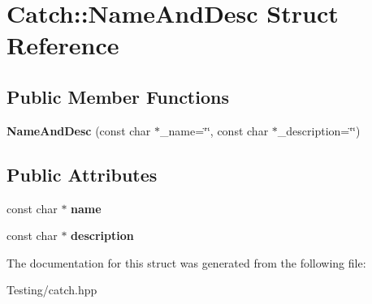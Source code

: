 \hypertarget{struct_catch_1_1_name_and_desc}{\section{Catch\-:\-:Name\-And\-Desc Struct Reference}
\label{struct_catch_1_1_name_and_desc}
}
\subsection*{Public Member Functions}
\begin{DoxyCompactItemize}
\item 
\hypertarget{struct_catch_1_1_name_and_desc_a189ceb9942fb5f6635140d6a09fc843a}{{\bfseries Name\-And\-Desc} (const char $\ast$\-\_\-name=\char`\"{}\char`\"{}, const char $\ast$\-\_\-description=\char`\"{}\char`\"{})}\label{struct_catch_1_1_name_and_desc_a189ceb9942fb5f6635140d6a09fc843a}

\end{DoxyCompactItemize}
\subsection*{Public Attributes}
\begin{DoxyCompactItemize}
\item 
\hypertarget{struct_catch_1_1_name_and_desc_a374b4ed8be3cf98be20ebde5273bde51}{const char $\ast$ {\bfseries name}}\label{struct_catch_1_1_name_and_desc_a374b4ed8be3cf98be20ebde5273bde51}

\item 
\hypertarget{struct_catch_1_1_name_and_desc_a3463a23ff65ce494fc380452b57b7970}{const char $\ast$ {\bfseries description}}\label{struct_catch_1_1_name_and_desc_a3463a23ff65ce494fc380452b57b7970}

\end{DoxyCompactItemize}


The documentation for this struct was generated from the following file\-:\begin{DoxyCompactItemize}
\item 
Testing/catch.\-hpp\end{DoxyCompactItemize}
